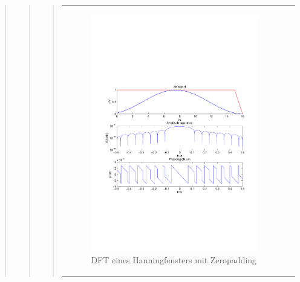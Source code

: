 \begin{quote}
\begin{quote}
\begin{quote}
\begin{center}
\begin{tabular}{ll}
\begin{minipage}{0.6\textwidth}
                         \begin{figure}[H]
                            \label{fig:}
                            \includegraphics[scale=0.5, trim = 1.5cm 7cm 1.5cm 8cm, clip]{./Bilder/HanningDFTzeropadding} %
                            \caption{DFT eines Hanningfensters mit Zeropadding}
                        \end{figure}
                   \vspace{-1.5em}
    
                    \end{minipage}
    
                \end{tabular}
                \end{center}
                

\end{quote}
\end{quote}
\end{quote}
